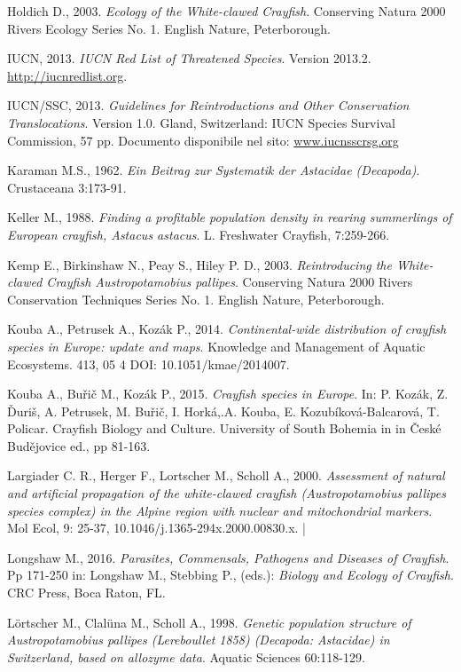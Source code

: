 \documentclass[11pt,a4paper,italian,twoside,openany]{memoir}
\begin{document}
\begin{thebibliography}{9}
 Holdich D., 2003. \emph{Ecology of the White-clawed Crayfish}. Conserving Natura 2000 Rivers Ecology Series No. 1. English Nature, Peterborough.

 IUCN, 2013. \emph{IUCN Red List of Threatened Species}. Version 2013.2. \url{http://iucnredlist.org}.

 IUCN/SSC, 2013. \emph{Guidelines for Reintroductions and Other Conservation Translocations}. Version 1.0. Gland, Switzerland: IUCN Species Survival Commission, 57 pp. Documento disponibile nel sito: \url{www.iucnsscrsg.org}

 Karaman M.S., 1962. \emph{Ein Beitrag zur Systematik der Astacidae (Decapoda)}. Crustaceana 3:173-91.

 Keller M., 1988. \emph{Finding a profitable population density in rearing summerlings of European crayfish, Astacus astacus}. L. Freshwater Crayfish, 7:259-266.

 Kemp E., Birkinshaw N., Peay S., Hiley P. D., 2003. \emph{Reintroducing the White-clawed Crayfish Austropotamobius pallipes}. Conserving Natura 2000 Rivers Conservation Techniques Series No. 1. English Nature, Peterborough.

 Kouba A., Petrusek A., Kozák P., 2014. \emph{Continental-wide distribution of crayfish species in Europe: update and maps}. Knowledge and Management of Aquatic Ecosystems. 413, 05 4 DOI: 10.1051/kmae/2014007.

 Kouba A., Buřič M., Kozák P., 2015. \emph{Crayfish species in Europe}. In: P. Kozák, Z. Ďuriš, A. Petrusek, M. Buřič, I. Horká,.A. Kouba, E. Kozubíková-Balcarová, T. Policar. Crayfish Biology and Culture. University of South Bohemia in in České Budějovice ed., pp 81-163.

 Largiader C. R., Herger F., Lortscher M., Scholl A., 2000. \emph{Assessment of natural and artificial propagation of the white-clawed crayfish (Austropotamobius pallipes species complex) in the Alpine region with nuclear and mitochondrial markers}. Mol Ecol, 9: 25-37, 10.1046/j.1365-294x.2000.00830.x.  |

 Longshaw M., 2016. \emph{Parasites, Commensals, Pathogens and Diseases of Crayfish}. Pp 171-250 in: Longshaw M., Stebbing P., (eds.): \emph{Biology and Ecology of Crayfish}. CRC Press, Boca Raton, FL.

 Lörtscher M., Clalüna M., Scholl A., 1998. \emph{Genetic population structure of Austropotamobius pallipes (Lereboullet 1858) (Decapoda: Astacidae) in Switzerland, based on allozyme data}. Aquatic Sciences 60:118-129.


\end{thebibliography}
\end{document}
